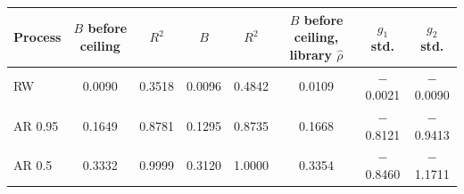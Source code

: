\begin{tabular}{lccccccc}
\toprule
Process & $B$ before ceiling & $R^2$ & $B$ & $R^2$ & $B$ before ceiling, library $\hat\rho$ & $g_1$ std. & $g_2$ std. \\
\midrule
RW & 0.0090 & 0.3518 & 0.0096 & 0.4842 & 0.0109 & $-$0.0021 & $-$0.0090 \\
AR 0.95 & 0.1649 & 0.8781 & 0.1295 & 0.8735 & 0.1668 & $-$0.8121 & $-$0.9413 \\
AR 0.5 & 0.3332 & 0.9999 & 0.3120 & 1.0000 & 0.3354 & $-$0.8460 & $-$1.1711 \\
\bottomrule
\end{tabular}
